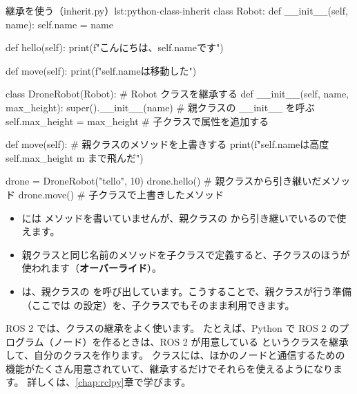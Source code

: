 \begin{codelisting}[style=python]{継承を使う（inherit.py）}{lst:python-class-inherit}
class Robot:
    def __init__(self, name):
        self.name = name

    def hello(self):
        print(f"こんにちは、{self.name}です")

    def move(self):
        print(f"{self.name}は移動した")


class DroneRobot(Robot):   # Robot クラスを継承する
    def __init__(self, name, max_height):
        super().__init__(name)          # 親クラスの __init__ を呼ぶ
        self.max_height = max_height    # 子クラスで属性を追加する

    def move(self):                     # 親クラスのメソッドを上書きする
        print(f"{self.name}は高度 {self.max_height} m まで飛んだ")


drone = DroneRobot("tello", 10)
drone.hello()    # 親クラスから引き継いだメソッド
drone.move()     # 子クラスで上書きしたメソッド
\end{codelisting}


\begin{itemize}
  \item {} には  メソッドを書いていませんが、親クラスの  から引き継いでいるので使えます。
  \item 親クラスと同じ名前のメソッドを子クラスで定義すると、子クラスのほうが使われます（\textbf{オーバーライド}）。
  \item {} は、親クラスの  を呼び出しています。こうすることで、親クラスが行う準備（ここでは  の設定）を、子クラスでもそのまま利用できます。
\end{itemize}

\begin{point}
  ROS 2 では、クラスの継承をよく使います。
  たとえば、Python で ROS 2 のプログラム（ノード）を作るときは、ROS 2 が用意している  というクラスを継承して、自分のクラスを作ります。
   クラスには、ほかのノードと通信するための機能がたくさん用意されていて、継承するだけでそれらを使えるようになります。
  詳しくは、\ref{chap:rclpy}章で学びます。
\end{point}

